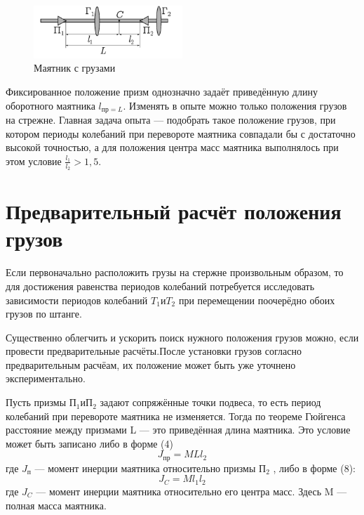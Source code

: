 \documentclass[a4paper]{article}
\begin{document}
\begin{figure}[h]
    \centering
    \includegraphics[width=0.5\textwidth]{pick2.PNG} 
    \caption{Маятник с грузами}
    \end{figure}

Фиксированное положение призм однозначно задаёт приведённую длину оборотного маятника $l_{\text{пр} = L }$. Изменять в опыте можно только положения грузов на стрежне. Главная задача опыта — подобрать такое положение грузов, при котором периоды колебаний при перевороте маятника 
совпадали бы с достаточно высокой точностью, а для положения центра 
масс маятника выполнялось при этом условие $\frac{l_{1}}{l_{2}}>1,5 $.

\section{Предварительный расчёт положения грузов}
Если первоначально расположить грузы на стержне произвольным образом, то для достижения равенства периодов колебаний потребуется исследовать зависимости периодов колебаний $T_{1} \text{и} T_{2}$ при перемещении поочерёдно обоих грузов по штанге.\par
Существенно облегчить и ускорить поиск нужного положения грузов 
можно, если провести предварительные расчёты.После установки грузов согласно предварительным расчёам, их положение может быть уже уточнено экспериментально.\par
Пусть призмы $\text{П}_{1} \text{и} \text{П}_{2}$ задают сопряжённые точки подвеса, то есть период колебаний при перевороте маятника не изменяется. Тогда по теореме 
Гюйгенса расстояние между призмами L — это приведённая длина маятника. Это условие может быть записано либо в форме (4)
\[J_{\text{пр}}= MLl_{2}\]
где $J_{\text{п}}$ — момент инерции маятника относительно призмы $\text{П}_{2}$ , либо в 
форме (8):
\[J_{C} = Ml_{1}l_{2}\]
где $J_{C}$ — момент инерции маятника относительно его центра масс. Здесь 
M — полная масса маятника.
\end{document}
